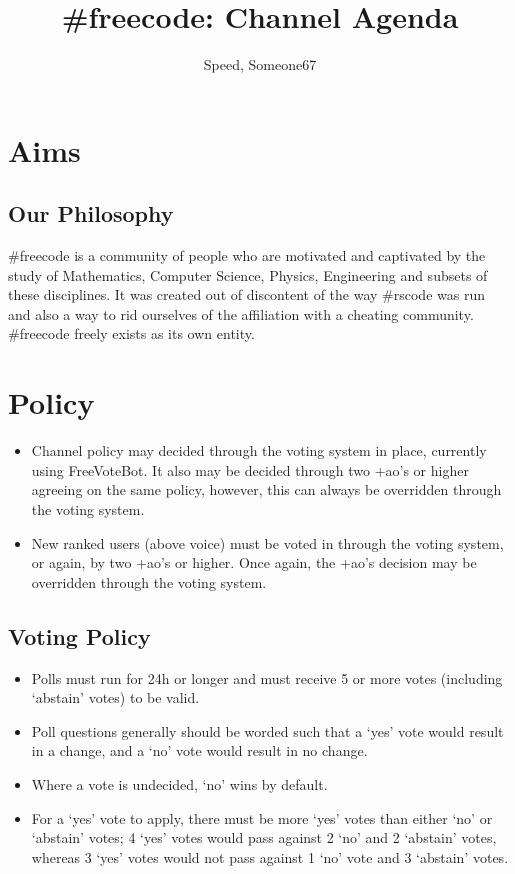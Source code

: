 \documentclass[11pt,a4paper,notitlepage]{article}
\title{\#freecode: Channel Agenda}
\author{Speed, Someone67}
\begin{document}
\maketitle

\section{Aims}
\subsection{Our Philosophy}
\#freecode is a community of people who are motivated and captivated by the study of Mathematics, Computer Science, Physics, Engineering and subsets of these disciplines.
It was created out of discontent of the way \#rscode was run and also a way to rid ourselves of the affiliation with a cheating community.
\#freecode freely exists as its own entity.

\section{Policy}
\begin{itemize}
\item Channel policy may decided through the voting system in place, currently using FreeVoteBot.
It also may be decided through two +ao's or higher agreeing on the same policy, however, this can always be overridden through the voting system.
\item New ranked users (above voice) must be voted in through the voting system, or again, by two +ao's or higher.
Once again, the +ao's decision may be overridden through the voting system.
\end{itemize}

\subsection{Voting Policy}
\begin{itemize}
\item Polls must run for 24h or longer and must receive 5 or more votes (including `abstain' votes) to be valid.
\item Poll questions generally should be worded such that a `yes' vote would result in a change, and a `no' vote would result in no change.
\item Where a vote is undecided, `no' wins by default.
\item For a `yes' vote to apply, there must be more `yes' votes than either `no' or `abstain' votes; 4 `yes' votes would pass against 2 `no' and 2 `abstain' votes, whereas 3 `yes' votes would not pass against 1 `no' vote and 3 `abstain' votes.
\end{itemize}
\end{document}
